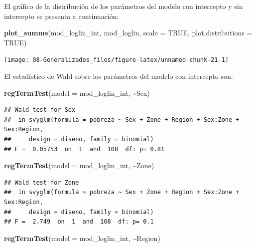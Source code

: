 \documentclass[
  spanish,
  12pt,
]{book}
\newenvironment{Shaded}{\begin{snugshade}}{\end{snugshade}}
\newcommand{\AttributeTok}[1]{\textcolor[rgb]{0.13,0.29,0.53}{#1}}
\newcommand{\ConstantTok}[1]{\textcolor[rgb]{0.56,0.35,0.01}{#1}}
\newcommand{\FunctionTok}[1]{\textcolor[rgb]{0.13,0.29,0.53}{\textbf{#1}}}
\newcommand{\NormalTok}[1]{#1}
\newcommand{\SpecialCharTok}[1]{\textcolor[rgb]{0.81,0.36,0.00}{\textbf{#1}}}
\begin{document}
El gráfico de la distribución de los parámetros del modelo con intercepto y sin intercepto se presenta a continuación:

\begin{Shaded}
\begin{Highlighting}[]
\FunctionTok{plot\_summs}\NormalTok{(mod\_loglin\_int, mod\_loglin, }\AttributeTok{scale =} \ConstantTok{TRUE}\NormalTok{, }\AttributeTok{plot.distributions =} \ConstantTok{TRUE}\NormalTok{)}
\end{Highlighting}
\end{Shaded}

\texttt{[image: 08-Generalizados\_files/figure-latex/unnamed-chunk-21-1]}

El estadístico de Wald sobre los parámetros del modelo con intercepto son:

\begin{Shaded}
\begin{Highlighting}[]
  \FunctionTok{regTermTest}\NormalTok{(}\AttributeTok{model =}\NormalTok{ mod\_loglin\_int, }\SpecialCharTok{\textasciitilde{}}\NormalTok{Sex)}
\end{Highlighting}
\end{Shaded}

\begin{verbatim}
## Wald test for Sex
##  in svyglm(formula = pobreza ~ Sex + Zone + Region + Sex:Zone + Sex:Region, 
##     design = diseno, family = binomial)
## F =  0.05753  on  1  and  108  df: p= 0.81
\end{verbatim}

\begin{Shaded}
\begin{Highlighting}[]
  \FunctionTok{regTermTest}\NormalTok{(}\AttributeTok{model =}\NormalTok{ mod\_loglin\_int, }\SpecialCharTok{\textasciitilde{}}\NormalTok{Zone)}
\end{Highlighting}
\end{Shaded}

\begin{verbatim}
## Wald test for Zone
##  in svyglm(formula = pobreza ~ Sex + Zone + Region + Sex:Zone + Sex:Region, 
##     design = diseno, family = binomial)
## F =  2.749  on  1  and  108  df: p= 0.1
\end{verbatim}

\begin{Shaded}
\begin{Highlighting}[]
  \FunctionTok{regTermTest}\NormalTok{(}\AttributeTok{model =}\NormalTok{ mod\_loglin\_int, }\SpecialCharTok{\textasciitilde{}}\NormalTok{Region)}
\end{Highlighting}
\end{Shaded}
\end{document}
